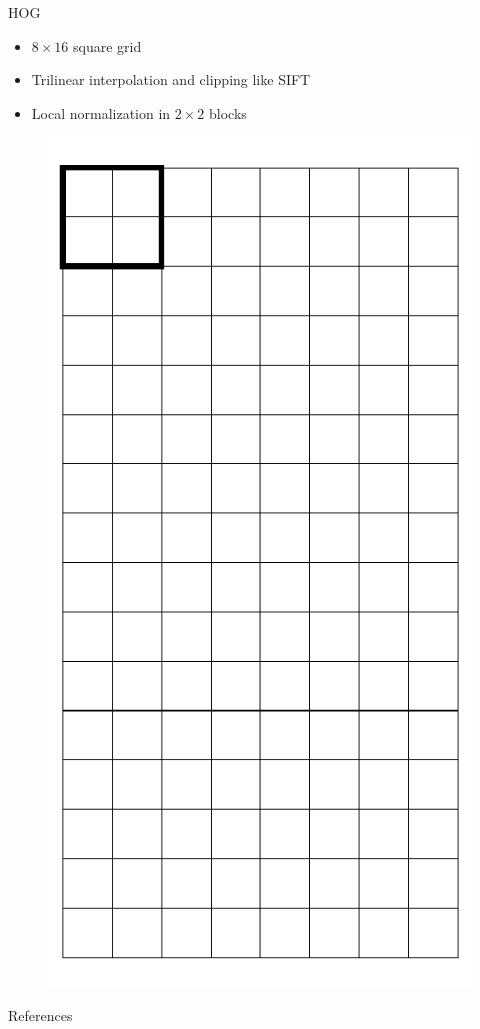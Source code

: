 \documentclass[14pt,t]{beamer}
\begin{document}
\begin{frame}{HOG \cite{dalal2005histograms}}
\ghostframe
\begin{minipage}[t]{0.7\textwidth}
	\begin{itemize}
	\item $8 \times 16$ square grid
	\item Trilinear interpolation and clipping like SIFT
	\item Local normalization in $2 \times 2$ blocks
	\end{itemize}
\end{minipage}
\begin{minipage}[t]{0.25\textwidth}
	\begin{figure}
		\includegraphics[width=\textwidth]{img/hogGrid.pdf}
	\end{figure}
\end{minipage}
\end{frame}
%
\begin{frame}{References}
\ghostframe
\printbibliography
\end{frame}
%
\end{document}
